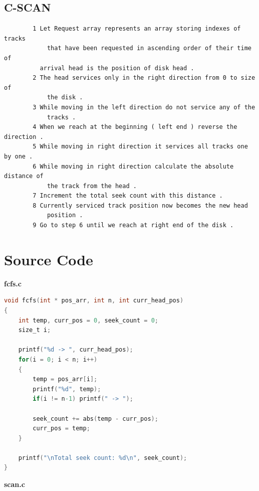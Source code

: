 \documentclass[13pt,oneside]{book}
\begin{document}
    \subsection*{C-SCAN}
    \begin{verbatim}
        1 Let Request array represents an array storing indexes of tracks
            that have been requested in ascending order of their time of
          arrival head is the position of disk head .
        2 The head services only in the right direction from 0 to size of
            the disk .
        3 While moving in the left direction do not service any of the
            tracks .
        4 When we reach at the beginning ( left end ) reverse the direction .
        5 While moving in right direction it services all tracks one by one .
        6 While moving in right direction calculate the absolute distance of
            the track from the head .
        7 Increment the total seek count with this distance .
        8 Currently serviced track position now becomes the new head
            position .
        9 Go to step 6 until we reach at right end of the disk .
    \end{verbatim}  
    
    \section*{Source Code}
    \Large\textbf{fcfs.c}
\small

\begin{lstlisting}[language=C]
void fcfs(int * pos_arr, int n, int curr_head_pos)
{
	int temp, curr_pos = 0, seek_count = 0;
	size_t i;

	printf("%d -> ", curr_head_pos);
	for(i = 0; i < n; i++)
	{
		temp = pos_arr[i];
		printf("%d", temp);
		if(i != n-1) printf(" -> ");

		seek_count += abs(temp - curr_pos);
		curr_pos = temp;
	}

	printf("\nTotal seek count: %d\n", seek_count);
}
    \end{lstlisting}
    
        \Large\textbf{scan.c}
\small
\end{document}
